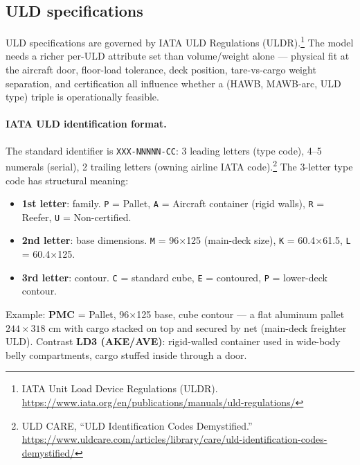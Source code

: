 \documentclass[11pt,a4paper]{article}
\theoremstyle{definition}
\begin{document}
\subsection{ULD specifications}
\label{sec:uld-spec}

ULD specifications are governed by IATA ULD Regulations
(ULDR).\footnote{IATA Unit Load Device Regulations (ULDR).
\url{https://www.iata.org/en/publications/manuals/uld-regulations/}} The
model needs a richer per-ULD attribute set than volume/weight alone --- physical
fit at the aircraft door, floor-load tolerance, deck position, tare-vs-cargo
weight separation, and certification all influence whether a (HAWB, MAWB-arc,
ULD type) triple is operationally feasible.

\paragraph{IATA ULD identification format.}
The standard identifier is \texttt{XXX-NNNNN-CC}: 3 leading letters (type
code), 4--5 numerals (serial), 2 trailing letters (owning airline IATA
code).\footnote{ULD CARE, ``ULD Identification Codes Demystified.''
\url{https://www.uldcare.com/articles/library/care/uld-identification-codes-demystified/}}
The 3-letter type code has structural meaning:
\begin{itemize}[noitemsep]
  \item \textbf{1st letter}: family. \texttt{P} = Pallet, \texttt{A} = Aircraft
        container (rigid walls), \texttt{R} = Reefer, \texttt{U} = Non-certified.
  \item \textbf{2nd letter}: base dimensions. \texttt{M} =
        96\textquotedbl{}$\times$125\textquotedbl{} (main-deck size), \texttt{K} =
        60.4\textquotedbl{}$\times$61.5\textquotedbl{}, \texttt{L} =
        60.4\textquotedbl{}$\times$125\textquotedbl{}.
  \item \textbf{3rd letter}: contour. \texttt{C} = standard cube, \texttt{E} =
        contoured, \texttt{P} = lower-deck contour.
\end{itemize}
Example: \textbf{PMC} = Pallet, 96\textquotedbl{}$\times$125\textquotedbl{} base,
cube contour --- a flat aluminum pallet $244 \times 318$ cm with cargo stacked
on top and secured by net (main-deck freighter ULD). Contrast \textbf{LD3
(AKE/AVE)}: rigid-walled container used in wide-body belly compartments, cargo
stuffed inside through a door.
\end{document}
